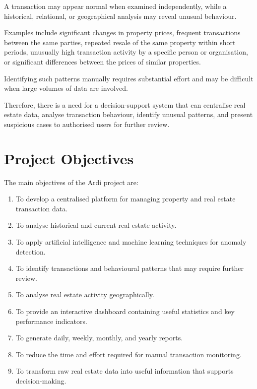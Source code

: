 \documentclass[12pt,a4paper,oneside]{report}
\begin{document}
A transaction may appear normal when examined independently, while a
historical, relational, or geographical analysis may reveal unusual
behaviour.

Examples include significant changes in property prices, frequent
transactions between the same parties, repeated resale of the same
property within short periods, unusually high transaction activity by
a specific person or organisation, or significant differences between
the prices of similar properties.

Identifying such patterns manually requires substantial effort and may
be difficult when large volumes of data are involved.

Therefore, there is a need for a decision-support system that can
centralise real estate data, analyse transaction behaviour, identify
unusual patterns, and present suspicious cases to authorised users for
further review.

\section{Project Objectives}

The main objectives of the Ardi project are:

\begin{enumerate}

    \item To develop a centralised platform for managing property
    and real estate transaction data.

    \item To analyse historical and current real estate activity.

    \item To apply artificial intelligence and machine learning
    techniques for anomaly detection.

    \item To identify transactions and behavioural patterns that
    may require further review.

    \item To analyse real estate activity geographically.

    \item To provide an interactive dashboard containing useful
    statistics and key performance indicators.

    \item To generate daily, weekly, monthly, and yearly reports.

    \item To reduce the time and effort required for manual
    transaction monitoring.

    \item To transform raw real estate data into useful information
    that supports decision-making.

\end{enumerate}
\end{document}
